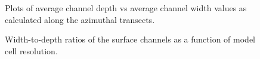\begin{figure}[!ht]
	\caption{Plots of average channel depth vs average channel width values as calculated along the azimuthal transects.}
	\label{fig:res_depth_v_width}
\end{figure}

\begin{figure}[!ht]
	\caption{Width-to-depth ratios of the surface channels as a function of model cell resolution.}
	\label{fig:res_wd}
\end{figure}

